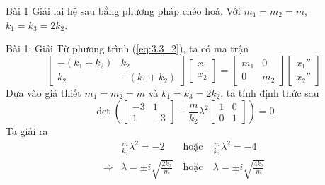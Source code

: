 \begin{frame}{Bài 1}
Giải lại hệ sau bằng phương pháp chéo hoá. Với \(m_1=m_2=m\), \(k_1=k_3=2k_2\).
\begin{center}
    \resizebox{1\linewidth}{!}{}
\end{center}
\end{frame}
\begin{frame}{Bài 1: Giải}
    Từ phương trình (\ref{eq:3.3_2}), ta có ma trận
    \begin{equation*}
    \left[
    \begin{array}{cc}
    -(k_1+k_2) & k_2 \\
    k_2 & -(k_1+ k_2)
    \end{array}
    \right] 
    \left[
    \begin{array}{c}
    x_1 \\
    x_2
    \end{array}
    \right] =  
    \left[
    \begin{array}{cc}
    m_1 & 0 \\
    0 & m_2 
    \end{array}
    \right] 
    \left[
    \begin{array}{c}
    x_1'' \\
    x_2''
    \end{array}
    \right]
    \end{equation*}
    Dựa vào giả thiết \(m_1=m_2=m\) và \(k_1 = k_3=2k_2\), ta tính định thức sau
    \begin{equation*}
        \det{\left(\left[
    \begin{array}{cc}
    -3 & 1 \\
    1 & -3
    \end{array}
    \right]  -  \frac{m}{k_2} \lambda^2 
    \left[
    \begin{array}{cc}
        1 & 0 \\
        0 & 1
    \end{array}
    \right]
    \right) 
    } = 0
    \end{equation*}
    Ta giải ra
    \begin{equation*}
    \begin{array}{clccc}
    &\displaystyle\frac{m}{k_2} \lambda^2 = -2 \ &\text{hoặc}&\displaystyle \ \frac{m}{k_2} \lambda^2=-4 \\
    \Rightarrow &\displaystyle \lambda= \pm i \sqrt{\frac{2k_2}{m}} \ &\text{hoặc}&\displaystyle \ \lambda = \pm i \sqrt{\frac{4k_2}{m}}
    \end{array}
    \end{equation*}
\end{frame}
